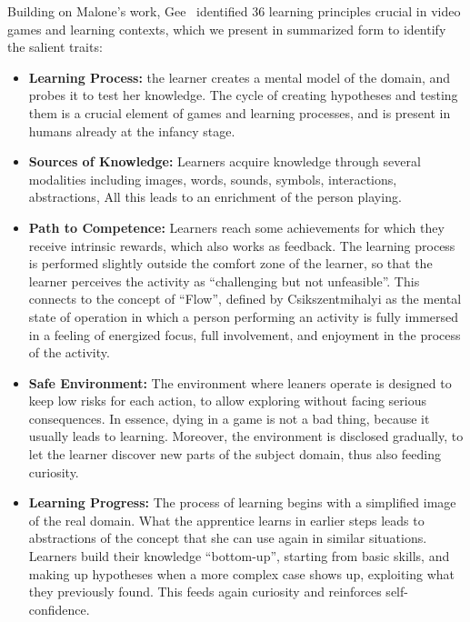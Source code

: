 Building on Malone's work, Gee~\cite{Gee2003} identified 36 learning principles crucial in video games and learning contexts, which we present in summarized form to identify the salient traits:

\begin{itemize}

\item\textbf{Learning Process:} the learner creates a mental model of the domain, and probes it to test her knowledge.
The cycle of creating hypotheses and testing them is a crucial element of games and learning processes, and is present in humans already at the infancy stage.

\item\textbf{Sources of Knowledge:} Learners acquire knowledge through several modalities including images, words, sounds, symbols, interactions, abstractions, \etc All this leads to an enrichment of the person playing.

\item\textbf{Path to Competence:} Learners reach some achievements for which they receive intrinsic rewards, which also works as feedback.
The learning process is performed slightly outside the comfort zone of the learner, so that the learner perceives the activity as ``challenging but not unfeasible''.
This connects to the concept of ``Flow'', defined by Csikszentmihalyi \cite{Csik1990a} as the mental state of operation in which a person performing an activity is fully immersed in a feeling of energized focus, full involvement, and enjoyment in the process of the activity.

\item\textbf{Safe Environment:} The environment where leaners operate is designed to keep low risks for each action, to allow exploring without facing serious consequences.
In essence, dying in a game is not a bad thing, because it usually leads to learning.
Moreover, the environment is disclosed gradually, to let the learner discover new parts of the subject domain, thus also feeding curiosity.

\item\textbf{Learning Progress:} The process of learning begins with a simplified image of the real domain.
What the apprentice learns in earlier steps leads to abstractions of the concept that she can use again in similar situations.
Learners build their knowledge ``bottom-up'', starting from basic skills, and making up hypotheses when a more complex case shows up, exploiting what they previously found.
This feeds again curiosity and reinforces self-confidence.

\end{itemize}

